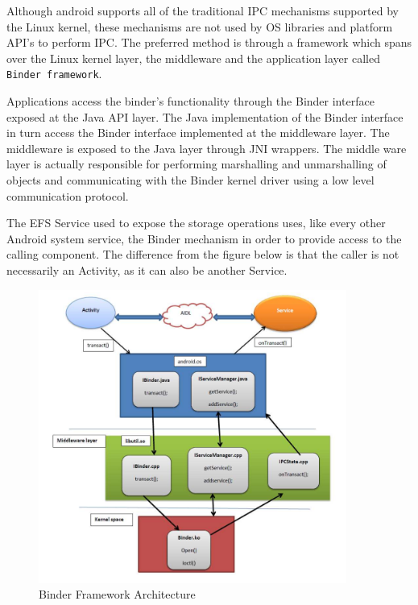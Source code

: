 Although android supports all of the traditional IPC mechanisms supported by the Linux kernel, these mechanisms are not used by OS libraries and platform API's to perform IPC. The preferred method is through a framework which spans over the Linux kernel layer, the middleware and the application layer called \texttt{Binder framework}.

Applications access the binder’s functionality through the Binder interface exposed at the Java API layer. The Java implementation of the Binder interface in turn access the Binder interface implemented at the middleware layer. The middleware is exposed to the Java layer through JNI wrappers. The middle ware layer is actually responsible for performing marshalling and unmarshalling of objects and communicating with the Binder kernel driver using a low level communication protocol.

The EFS Service used to expose the storage operations uses, like every other Android system service, the Binder mechanism in order to provide access to the calling component. The difference from the figure below is that the caller is not necessarily an Activity, as it can also be another Service.

\begin{figure}[h!]
\centering
    \includegraphics[width=0.9\textwidth]{src/img/binder/binderarch.png}
\caption{Binder Framework Architecture\cite{binder}}
\end{figure}


